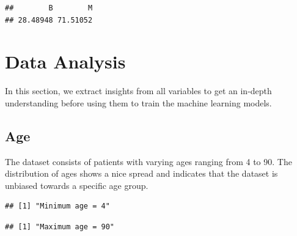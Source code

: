 \documentclass[]{article}
\newenvironment{Shaded}{\begin{snugshade}}{\end{snugshade}}
\newcommand{\KeywordTok}[1]{\textcolor[rgb]{0.13,0.29,0.53}{\textbf{#1}}}
\newcommand{\NormalTok}[1]{#1}
\newcommand{\OperatorTok}[1]{\textcolor[rgb]{0.81,0.36,0.00}{\textbf{#1}}}
\newcommand{\StringTok}[1]{\textcolor[rgb]{0.31,0.60,0.02}{#1}}
\begin{document}
\begin{verbatim}
##        B        M 
## 28.48948 71.51052
\end{verbatim}

\section{Data Analysis}
\label{sec:dataanalysis}

In this section, we extract insights from all variables to get an
in-depth understanding before using them to train the machine learning
models.

\subsection{Age}

The dataset consists of patients with varying ages ranging from 4 to 90.
The distribution of ages shows a nice spread and indicates that the
dataset is unbiased towards a specific age group.

\begin{Shaded}
\end{Shaded}

\begin{verbatim}
## [1] "Minimum age = 4"
\end{verbatim}

\begin{Shaded}
\end{Shaded}

\begin{verbatim}
## [1] "Maximum age = 90"
\end{verbatim}
\end{document}
